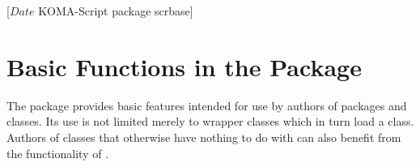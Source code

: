 %
%
%
%
%
%
%
%
% 
%
%
%
%

                 [$Date$
                  KOMA-Script package scrbase]


\chapter{Basic Functions in the  Package}
\BeginIndexGroup
{}%

The  package provides basic features intended for use by
authors of packages and classes. Its use is not limited merely to wrapper
classes which in turn load a \KOMAScript{} class. Authors of classes that
otherwise have nothing to do with \KOMAScript{} can also benefit from the
functionality of .

